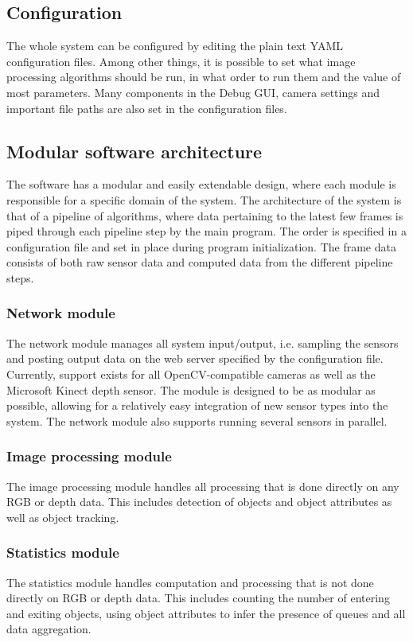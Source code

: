 \subsection{Configuration}
The whole system can be configured by editing the plain text YAML configuration files. Among other things, it is possible to set what image processing algorithms should be run, in what order to run them and the value of most parameters. Many components in the Debug GUI, camera settings and important file paths are also set in the configuration files. 

\subsection{Modular software architecture}
The software has a modular and easily extendable design, where each module is responsible for a specific domain of the system. The architecture of the system is that of a pipeline of algorithms, where data pertaining to the latest few frames is piped through each pipeline step by the main program. The order is specified in a configuration file and set in place during program initialization. The frame data consists of both raw sensor data and computed data from the different pipeline steps. 

\subsubsection{Network module}
The network module manages all system input/output, i.e. sampling the sensors and posting output data on the web server specified by the configuration file. Currently, support exists for all OpenCV-compatible cameras as well as the Microsoft Kinect depth sensor. The module is designed to be as modular as possible, allowing for a relatively easy integration of new sensor types into the system. The network module also supports running several sensors in parallel. 

\subsubsection{Image processing module}
The image processing module handles all processing that is done directly on any RGB or depth data. This includes detection of objects and object attributes as well as object tracking.

\subsubsection{Statistics module}
The statistics module handles computation and processing that is not done directly on RGB or depth data. This includes counting the number of entering and exiting objects, using object attributes to infer the presence of queues and all data aggregation. 

